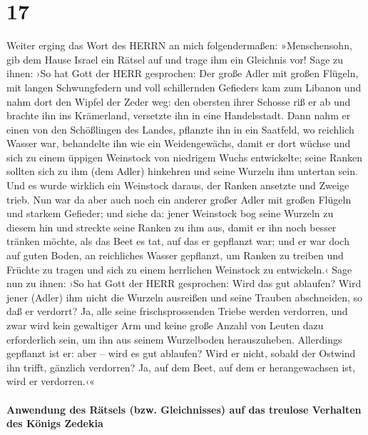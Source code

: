 \hypertarget{section-16}{%
\section{17}\label{section-16}}

Weiter erging das Wort des HERRN an mich folgendermaßen:
»Menschensohn, gib dem Hause Israel ein Rätsel auf und
trage ihm ein Gleichnis vor! Sage zu ihnen: ›So hat Gott
der HERR gesprochen: Der große Adler mit großen Flügeln, mit langen
Schwungfedern und voll schillernden Gefieders kam zum Libanon und nahm
dort den Wipfel der Zeder weg: den obersten ihrer Schosse
riß er ab und brachte ihn ins Krämerland, versetzte ihn in eine
Handelsstadt. Dann nahm er einen von den Schößlingen des
Landes, pflanzte ihn in ein Saatfeld, wo reichlich Wasser war,
behandelte ihn wie ein Weidengewächs, damit er dort wüchse
und sich zu einem üppigen Weinstock von niedrigem Wuchs entwickelte;
seine Ranken sollten sich zu ihm (dem Adler) hinkehren und seine Wurzeln
ihm untertan sein. Und es wurde wirklich ein Weinstock daraus, der
Ranken ansetzte und Zweige trieb. Nun war da aber auch
noch ein anderer großer Adler mit großen Flügeln und starkem Gefieder;
und siehe da: jener Weinstock bog seine Wurzeln zu diesem hin und
streckte seine Ranken zu ihm aus, damit er ihn noch besser tränken
möchte, als das Beet es tat, auf das er gepflanzt war; und
er war doch auf guten Boden, an reichliches Wasser gepflanzt, um Ranken
zu treiben und Früchte zu tragen und sich zu einem herrlichen Weinstock
zu entwickeln.‹ Sage nun zu ihnen: ›So hat Gott der HERR
gesprochen: Wird das gut ablaufen? Wird jener (Adler) ihm nicht die
Wurzeln ausreißen und seine Trauben abschneiden, so daß er verdorrt? Ja,
alle seine frischsprossenden Triebe werden verdorren, und zwar wird kein
gewaltiger Arm und keine große Anzahl von Leuten dazu erforderlich sein,
um ihn aus seinem Wurzelboden herauszuheben. Allerdings
gepflanzt ist er: aber -- wird es gut ablaufen? Wird er nicht, sobald
der Ostwind ihn trifft, gänzlich verdorren? Ja, auf dem Beet, auf dem er
herangewachsen ist, wird er verdorren.‹«

\hypertarget{anwendung-des-ruxe4tsels-bzw.-gleichnisses-auf-das-treulose-verhalten-des-kuxf6nigs-zedekia}{%
\paragraph{Anwendung des Rätsels (bzw. Gleichnisses) auf das treulose
Verhalten des Königs
Zedekia}\label{anwendung-des-ruxe4tsels-bzw.-gleichnisses-auf-das-treulose-verhalten-des-kuxf6nigs-zedekia}}

